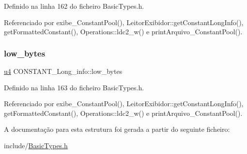 Definido na linha 162 do ficheiro Basic\+Types.\+h.



Referenciado por exibe\+\_\+\+Constant\+Pool(), Leitor\+Exibidor\+::get\+Constant\+Long\+Info(), get\+Formatted\+Constant(), Operations\+::ldc2\+\_\+w() e print\+Arquivo\+\_\+\+Constant\+Pool().

\mbox{\label{structCONSTANT__Long__info_aafb2c41b1cf577fab97718cf51e0c00f}} 
\subsubsection{\texorpdfstring{low\+\_\+bytes}{low\_bytes}}
{\footnotesize\ttfamily \hyperlink{BasicTypes_8h_ae5be1f726785414dd1b77d60df074c9d}{u4} C\+O\+N\+S\+T\+A\+N\+T\+\_\+\+Long\+\_\+info\+::low\+\_\+bytes}



Definido na linha 163 do ficheiro Basic\+Types.\+h.



Referenciado por exibe\+\_\+\+Constant\+Pool(), Leitor\+Exibidor\+::get\+Constant\+Long\+Info(), get\+Formatted\+Constant(), Operations\+::ldc2\+\_\+w() e print\+Arquivo\+\_\+\+Constant\+Pool().



A documentação para esta estrutura foi gerada a partir do seguinte ficheiro\+:\begin{DoxyCompactItemize}
\item 
include/\hyperlink{BasicTypes_8h}{Basic\+Types.\+h}\end{DoxyCompactItemize}
